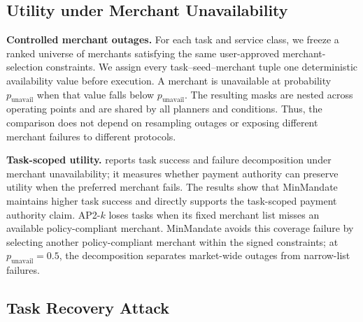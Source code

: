 \documentclass[letterpaper]{article}
\newcommand{\system}{MinMandate\xspace}
\begin{document}
\subsection{Utility under Merchant Unavailability}
\label{sec:eval-utility}

\textbf{Controlled merchant outages.}
For each task and service class, we freeze a ranked universe of merchants
satisfying the same user-approved merchant-selection constraints. We assign
every task--seed--merchant tuple one deterministic availability value before
execution. A merchant is unavailable at probability
\(p_{\mathrm{unavail}}\) when that value falls below \(p_{\mathrm{unavail}}\).
The resulting masks are nested across operating points and are shared by all
planners and conditions. Thus, the comparison does not depend on resampling
outages or exposing different merchant failures to different protocols.

\textbf{Task-scoped utility.}
 reports task success and failure
decomposition under merchant unavailability; it measures whether payment
authority can preserve utility when the preferred merchant fails. The results
show that \system maintains higher task success and directly supports the
task-scoped payment authority claim. AP2-\(k\) loses tasks when its fixed
merchant list misses an available policy-compliant merchant. \system avoids
this coverage failure by selecting another policy-compliant merchant within the
signed constraints; at \(p_{\mathrm{unavail}}=0.5\), the decomposition separates
market-wide outages from narrow-list failures.


\subsection{Task Recovery Attack}
\label{sec:task-leakage}
\end{document}
